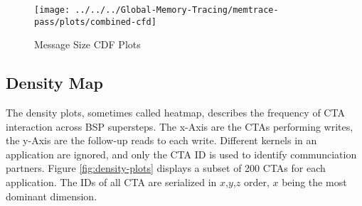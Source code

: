 \begin{figure}[t]
	\texttt{[image: ../../../Global-Memory-Tracing/memtrace-pass/plots/combined-cfd]}
	\caption{Message Size CDF Plots}
	\label{fig:CDF}
\end{figure}
\subsection{Density Map}
The density plots, sometimes called heatmap, describes the frequency of CTA interaction across BSP supersteps. The x-Axis are the CTAs performing writes, the y-Axis are the follow-up reads to each write. Different kernels in an application are ignored, and only the CTA ID is used to identify communciation partners. Figure \ref{fig:density-plots} displays a subset of 200 CTAs for each application. The IDs of all CTA are serialized in $x$,$y$,$z$ order, $x$ being the most dominant dimension. 

